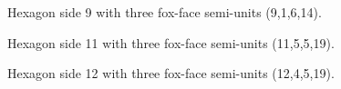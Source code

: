 \documentclass[11pt]{article}
\begin{document}
\begin{figure}[h!]
\centering
{}
\caption{Hexagon side 9 with three fox-face semi-units (9,1,6,14).}
\end{figure}

\begin{figure}[h!]
\centering
{}
\caption{Hexagon side 11 with three fox-face semi-units (11,5,5,19).}
\end{figure}

\begin{figure}[h!]
\centering
{}
\caption{Hexagon side 12 with three fox-face semi-units (12,4,5,19).}
\end{figure}
\end{document}
